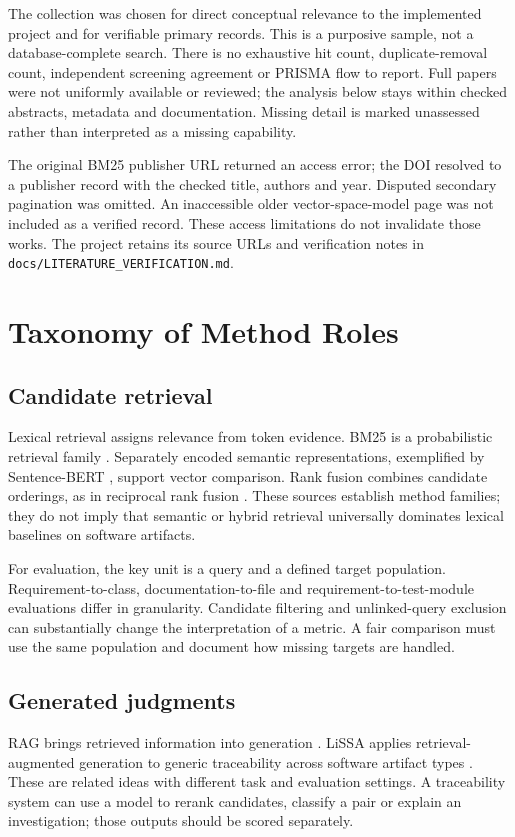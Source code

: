 \documentclass[conference,a4paper]{IEEEtran}
\begin{document}
The collection was chosen for direct conceptual relevance to the implemented project and for verifiable primary records. This is a purposive sample, not a database-complete search. There is no exhaustive hit count, duplicate-removal count, independent screening agreement or PRISMA flow to report. Full papers were not uniformly available or reviewed; the analysis below stays within checked abstracts, metadata and documentation. Missing detail is marked unassessed rather than interpreted as a missing capability.

The original BM25 publisher URL returned an access error; the DOI resolved to a publisher record with the checked title, authors and year. Disputed secondary pagination was omitted. An inaccessible older vector-space-model page was not included as a verified record. These access limitations do not invalidate those works. The project retains its source URLs and verification notes in \texttt{docs/LITERATURE\_VERIFICATION.md}.

\section{Taxonomy of Method Roles}
\subsection{Candidate retrieval}
Lexical retrieval assigns relevance from token evidence. BM25 is a probabilistic retrieval family \cite{bm25}. Separately encoded semantic representations, exemplified by Sentence-BERT \cite{sbert}, support vector comparison. Rank fusion combines candidate orderings, as in reciprocal rank fusion \cite{rrf}. These sources establish method families; they do not imply that semantic or hybrid retrieval universally dominates lexical baselines on software artifacts.

For evaluation, the key unit is a query and a defined target population. Requirement-to-class, documentation-to-file and requirement-to-test-module evaluations differ in granularity. Candidate filtering and unlinked-query exclusion can substantially change the interpretation of a metric. A fair comparison must use the same population and document how missing targets are handled.

\subsection{Generated judgments}
RAG brings retrieved information into generation \cite{rag}. LiSSA applies retrieval-augmented generation to generic traceability across software artifact types \cite{lissa}. These are related ideas with different task and evaluation settings. A traceability system can use a model to rerank candidates, classify a pair or explain an investigation; those outputs should be scored separately.
\end{document}
